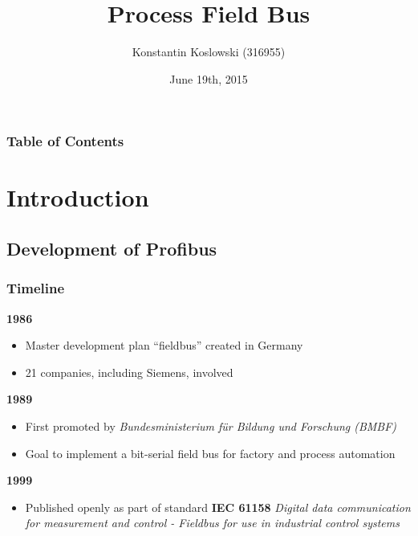 \documentclass{beamer}
\title[Profibus]{\textbf{Pro}cess \textbf{Fi}eld \textbf{Bus}}
\author[Koslowski]{Konstantin Koslowski (316955)}
\institute[]
{TU Berlin \\
 Department of Telecommunication Systems \\
 Telecommunication Networks Group \\
}
\date{June 19th, 2015}
\begin{document}
\begin{frame}
  \titlepage
\end{frame}

\begin{frame}
\frametitle{Table of Contents}
\setcounter{tocdepth}{1}
\tableofcontents
\end{frame}

\section{Introduction}


\subsection{Development of Profibus}
\begin{frame}
\frametitle{Timeline}
  \textbf{1986}
  \begin{itemize}
    \item Master development plan ``fieldbus'' created in Germany
    \item 21 companies, including Siemens, involved
  \end{itemize}

  \textbf{1989}
  \begin{itemize}
    \item First promoted by \textit{Bundesministerium f\"ur Bildung und
        Forschung (BMBF)}
    \item Goal to implement a bit-serial field bus for factory and process automation
  \end{itemize}

  \textbf{1999}
  \begin{itemize}
    \item Published openly as part of standard \textbf{IEC 61158} \textit{Digital data
        communication for measurement and control - Fieldbus for use in industrial control
        systems}
  \end{itemize}
\end{frame}
\end{document}
